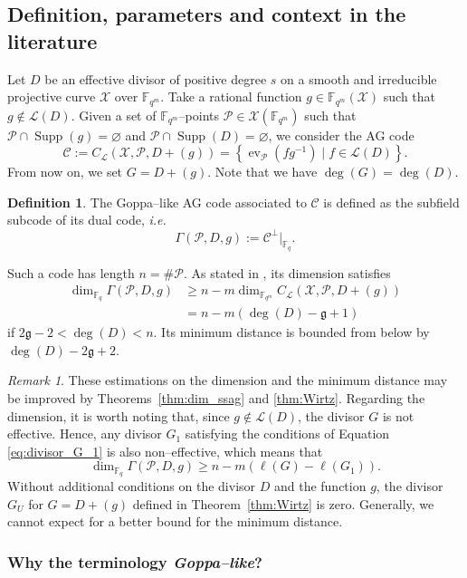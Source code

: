 \documentclass[peerreview]{IEEEtran}
\theoremstyle{plain}
\theoremstyle{definition}
\newtheorem{definition}[thm]{Definition}
\theoremstyle{remark}
\newtheorem{remark}[thm]{Remark}
\DeclareMathOperator{\ev}{ev}
\newcommand{\calP}{\mathcal{P}}
\newcommand{\calL}{\mathcal{L}}
\newcommand{\calC}{\mathcal{C}}
\newcommand{\calX}{\mathcal{X}}
\newcommand{\fqm}{\mathbb{F}_{q^m}}
\newcommand{\fq}{\mathbb{F}_{q}}
\newcommand{\set}[1]{\left\{#1\right\}}
\newcommand{\Supp}{\operatorname{Supp}}
\begin{document}
	\subsection{Definition, parameters and context in the literature}\label{subsec:def-Goppa}
	\noindent
	Let $D$ be an effective divisor of positive degree $s$ on a smooth and irreducible projective curve $\calX$ over $\fqm$. Take a rational function $g \in \fqm(\calX)$ such that $g \notin \calL(D)$. Given a set of $\fqm$--points $\calP \in \calX(\fqm)$ such that $\calP \cap \Supp(g) = \varnothing$ and $\calP \cap \Supp(D) = \varnothing$, we consider the AG code
	\[\calC := C_{\calL}(\calX,\calP,D+(g))=\set{\ev_{\calP}(fg^{-1}) \mid f \in \calL(D)}.\]
	From now on, we set $G=D+(g)$. Note that we have $\deg(G)=\deg(D)$.
	\begin{definition} \label{def:Goppa--like_AG_code}
		The Goppa--like AG code associated to $\calC$ is defined as the subfield subcode of its dual code, \emph{i.e.}
		\[ \Gamma(\calP,D,g) := \calC^{\perp}|_{\fq}.\]
	\end{definition}%
	Such a code has length $n = \# \calP$. As stated in \cite[Theorem~1]{JM96}, its dimension satisfies 
	\[\begin{aligned}
		\dim_{\fq} \Gamma(\calP,D,g) 	&\geq n-m \dim_{\fqm} C_{\calL}(\calX,\calP,D+(g)) \\
										&=n-m(\deg (D) - \mathfrak{g} +1 )
	\end{aligned}\]
	if $2\mathfrak{g} - 2 < \deg (D) < n$. Its minimum distance is bounded from below by $\deg (D) - 2 \mathfrak{g} + 2$.
	
	\begin{remark}
		These estimations on the dimension and the minimum distance may be improved by Theorems~\ref{thm:dim_ssag} and \ref{thm:Wirtz}. Regarding the dimension, it is worth noting that, since $g \notin \calL(D)$, the divisor $G$ is not effective. Hence, any divisor $G_1$ satisfying the conditions of Equation \eqref{eq:divisor_G_1} is also non--effective, which means that
		\[	\dim_{\fq}  \Gamma(\calP,D,g) \geq 	n-m\left(\ell(G) - \ell(G_1)\right). \]
		Without additional conditions on the divisor $D$ and the function $g$, the divisor $G_U$ for $G=D+(g)$ defined in Theorem~\ref{thm:Wirtz} is zero. Generally, we cannot expect for a better bound for the minimum distance. 
	\end{remark}
	
	
	
	\subsubsection{Why the terminology \textit{Goppa--like}?}
	
\end{document}
